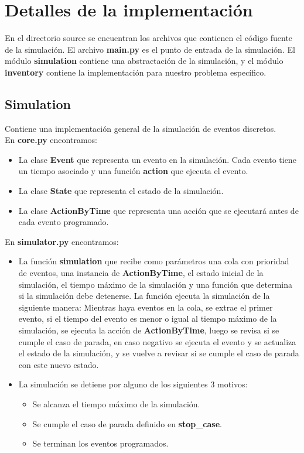 \documentclass{article}
\begin{document}
\section*{Detalles de la implementación}

En el directorio source se encuentran los archivos que contienen el código fuente de la simulación. El archivo \textbf{main.py}
es el punto de entrada de la simulación.
El módulo \textbf{simulation} contiene una abstractación de la simulación, y el módulo \textbf{inventory} contiene la implementación
para nuestro problema específico.

\subsection*{Simulation}

Contiene una implementación general de la simulación de eventos discretos.\\

En \textbf{core.py} encontramos:

\begin{itemize}
    \item La clase \textbf{Event} que representa un evento en la simulación. Cada evento tiene un tiempo asociado y una función \textbf{action} que ejecuta el evento.
    \item La clase \textbf{State} que representa el estado de la simulación.
    \item La clase \textbf{ActionByTime} que representa una acción que se ejecutará antes de cada evento programado.
\end{itemize}

En \textbf{simulator.py} encontramos:

\begin{itemize}
    \item La función \textbf{simulation} que recibe como parámetros una cola con prioridad de eventos, una instancia de \textbf{ActionByTime},
  el estado
  inicial de la simulación, el tiempo máximo de la simulación y una función que determina si la simulación debe
  detenerse. La función ejecuta la simulación de la siguiente manera:
  Mientras haya eventos en la cola, se extrae el primer evento, si el tiempo del evento es menor o igual al tiempo
  máximo de la simulación, se ejecuta la acción de \textbf{ActionByTime}, luego se revisa si se cumple el caso de parada, en caso
  negativo se ejecuta el evento y se actualiza el estado de la simulación, y se vuelve a revisar si se cumple el caso de
  parada con este nuevo estado.
    \item La simulación se detiene por alguno de los siguientes 3 motivos:
    \begin{itemize}
        \item Se alcanza el tiempo máximo de la simulación.
        \item Se cumple el caso de parada definido en \textbf{stop\_case}.
        \item Se terminan los eventos programados.
    \end{itemize}
\end{itemize}
\end{document}
